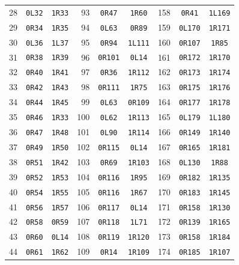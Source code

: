 \documentclass[10pt,a4paper]{article}
\begin{document}
\begin{center}
\begin{tabular}{rcc@{\hspace{14pt}}rcc@{\hspace{14pt}}rcc}
28 & \texttt{0L32} & \texttt{1R33} & 93 & \texttt{0R47} & \texttt{1R60} & 158 & \texttt{0R41} & \texttt{1L169} \\
29 & \texttt{0R34} & \texttt{1R35} & 94 & \texttt{0L63} & \texttt{0R89} & 159 & \texttt{0L170} & \texttt{1R171} \\
30 & \texttt{0L36} & \texttt{1L37} & 95 & \texttt{0R94} & \texttt{1L111} & 160 & \texttt{0R107} & \texttt{1R85} \\
31 & \texttt{0R38} & \texttt{1R39} & 96 & \texttt{0R101} & \texttt{0L14} & 161 & \texttt{0R172} & \texttt{1R170} \\
32 & \texttt{0R40} & \texttt{1R41} & 97 & \texttt{0R36} & \texttt{1R112} & 162 & \texttt{0R173} & \texttt{1R174} \\
33 & \texttt{0R42} & \texttt{1R43} & 98 & \texttt{0R111} & \texttt{1R75} & 163 & \texttt{0R175} & \texttt{1R176} \\
34 & \texttt{0R44} & \texttt{1R45} & 99 & \texttt{0L63} & \texttt{0R109} & 164 & \texttt{0R177} & \texttt{1R178} \\
35 & \texttt{0R46} & \texttt{1R33} & 100 & \texttt{0L62} & \texttt{1R113} & 165 & \texttt{0L179} & \texttt{1L180} \\
36 & \texttt{0R47} & \texttt{1R48} & 101 & \texttt{0L90} & \texttt{1R114} & 166 & \texttt{0R149} & \texttt{1R140} \\
37 & \texttt{0R49} & \texttt{1R50} & 102 & \texttt{0R115} & \texttt{0L14} & 167 & \texttt{0R165} & \texttt{1R181} \\
38 & \texttt{0R51} & \texttt{1R42} & 103 & \texttt{0R69} & \texttt{1R103} & 168 & \texttt{0L130} & \texttt{1R88} \\
39 & \texttt{0R52} & \texttt{1R53} & 104 & \texttt{0R116} & \texttt{1R95} & 169 & \texttt{0R182} & \texttt{1R135} \\
40 & \texttt{0R54} & \texttt{1R55} & 105 & \texttt{0R116} & \texttt{1R67} & 170 & \texttt{0R183} & \texttt{1R145} \\
41 & \texttt{0R56} & \texttt{1R57} & 106 & \texttt{0R117} & \texttt{0L14} & 171 & \texttt{0R158} & \texttt{1R130} \\
42 & \texttt{0R58} & \texttt{0R59} & 107 & \texttt{0R118} & \texttt{1L71} & 172 & \texttt{0R139} & \texttt{1R165} \\
43 & \texttt{0R60} & \texttt{0L14} & 108 & \texttt{0R119} & \texttt{1R120} & 173 & \texttt{0R158} & \texttt{1R184} \\
44 & \texttt{0R61} & \texttt{1R62} & 109 & \texttt{0R14} & \texttt{1R109} & 174 & \texttt{0R185} & \texttt{1R107} \\

\end{tabular}
\end{center}
\end{document}
